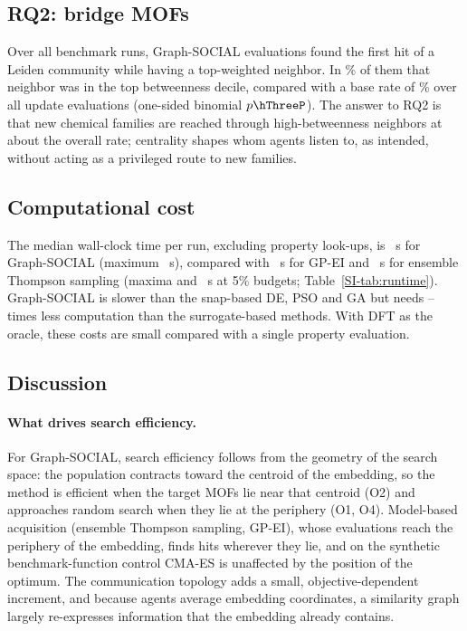 \documentclass[journal=jcisd8,manuscript=article]{achemso}
\newcommand{\gs}{Graph-SOCIAL}
\begin{document}
\subsection{RQ2: bridge MOFs}
Over all benchmark runs, \hThreeN{} \gs{} evaluations found the first hit of a Leiden community while having a top-weighted neighbor. In \hThreeRate\% of them that neighbor was in the top betweenness decile, compared with a base rate of \hThreeBase\% over all \hThreeBaseN{} update evaluations (one-sided binomial $p\hThreeP$). The answer to RQ2 is that new chemical families are reached through high-betweenness neighbors at about the overall rate; centrality shapes whom agents listen to, as intended, without acting as a privileged route to new families.

\subsection{Computational cost}
The median wall-clock time per run, excluding property look-ups, is \rtGs~s for \gs{} (maximum \rtGsMax~s), compared with \rtGp~s for GP-EI and \rtTs~s for ensemble Thompson sampling (maxima \rtGpMax{} and \rtTsMax~s at 5\% budgets; Table~\ref{SI-tab:runtime}). \gs{} is slower than the snap-based DE, PSO and GA but needs \rtRatioLo--\rtRatioHi{} times less computation than the surrogate-based methods. With DFT as the oracle, these costs are small compared with a single property evaluation.

\subsection{Discussion}

\paragraph{What drives search efficiency.}
For \gs{}, search efficiency follows from the geometry of the search space: the population contracts toward the centroid of the embedding, so the method is efficient when the target MOFs lie near that centroid (O2) and approaches random search when they lie at the periphery (O1, O4). Model-based acquisition (ensemble Thompson sampling, GP-EI), whose evaluations reach the periphery of the embedding, finds hits wherever they lie, and on the synthetic benchmark-function control CMA-ES is unaffected by the position of the optimum. The communication topology adds a small, objective-dependent increment, and because agents average embedding coordinates, a similarity graph largely re-expresses information that the embedding already contains.
\end{document}
